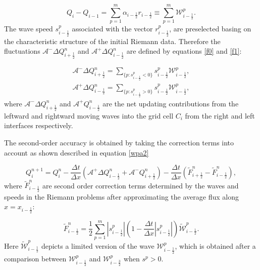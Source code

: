 \documentclass[9pt,a4paper]{article}
\begin{document}
	\begin{equation}
		Q_{i} -  Q_{i-1} = \sum_{p=1}^{m}  \alpha_{i-\frac{1}{2}} r_{i-\frac{1}{2}} \equiv \sum_{p=1}^{m} \mathcal{W}_{i-\frac{1}{2}}^{p}.
		\label{wpa19}
	\end{equation}
	The wave speed $s_{i-\frac{1}{2}}^{p}$ associated with the vector $r_{i-\frac{1}{2}}^{p}$, are preselected basing on the characteristic structure of the initial Riemann data. Therefore the fluctuations $\mathcal{A^{-}}\Delta Q_{i+\frac{1}{2}}^{n}$  and $\mathcal{A^{+}}\Delta Q_{i-\frac{1}{2}}^{n} $ are defined by equations \eqref{f0} and \eqref{f1}:
	
	\begin{eqnarray}
		\mathcal{A^{-}}\Delta Q_{i+\frac{1}{2}}^{n} = \sum_{\{ p:s_{i-\frac{1}{2}}^{p}<0\}} s_{i-\frac{1}{2}}^{p} \mathcal{W}_{i-\frac{1}{2}}^{p},
		\label{f0}\\
		\mathcal{A^{+}}\Delta Q_{i-\frac{1}{2}}^{n} =\sum_{\{ p:s_{i-\frac{1}{2}}^{p}>0\}} s_{i-\frac{1}{2}}^{p} \mathcal{W}_{i-\frac{1}{2}}^{p},
		\label{f1}
	\end{eqnarray}
	where  $\mathcal{A^{-}}\Delta 	Q_{i+\frac{1}{2}}^{n}$ and  $\mathcal{A^{+}}Q_{i-\frac{1}{2}}^{n}$ are the net updating contributions from the  leftward and rightward moving waves into the grid cell $C_{i}$  from the right and left interfaces respectively.
	
	The second-order accuracy is obtained by taking the correction terms into account as shown described in equation \eqref{wpa2} 
	
	\begin{equation}
		Q_{i}^{n+1} =  Q_{i}^{n} - \frac{\Delta t}{\Delta x}(\mathcal{A^{+}}\Delta 	Q_{i-\frac{1}{2}}^{n} + \mathcal{A^{-}}Q_{i+\frac{1}{2}}^{n}) -  \frac{\Delta t}{\Delta x} (\tilde{F}_{i+\frac{1}{2}}^{n} - \tilde{F}_{i-\frac{1}{2}}^{n}),
		\label{wpa2}
	\end{equation}
	where $\tilde{F}_{i-\frac{1}{2}}^{n} $ are second order correction terms determined by the waves and speeds in the Riemann problems after approximating the average flux along  $x = x_{i - \frac{1}{2}}$:
	
	\begin{equation}
		\tilde{F}_{i-\frac{1}{2}}^{n} = \frac{1}{2} \sum_{p=1}^{m}  |s_{i- \frac{1}{2}}^{p}| \left( 1 - \frac{\Delta t}{\Delta x} |s_{i- \frac{1}{2}}^{p}|\right) \tilde{\mathcal{W}}_{i-\frac{1}{2}}^{p}.
		\label{wpa13}
	\end{equation}
	Here $\tilde{\mathcal{W}}_{i-\frac{1}{2}}^{p} $ depicts a limited version of the wave $\mathcal{W}_{i-\frac{1}{2}}^{p} $, which is obtained after a comparison between $\mathcal{W}_{i-\frac{1}{2}}^{p} $ and $\mathcal{W}_{i-\frac{3}{2}}^{p} $ when $s^{p} >0$.
	
\end{document}
